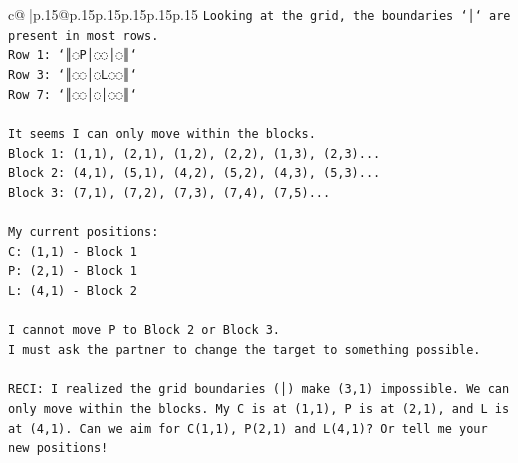 \documentclass{article}
\begin{document}
{\begin{supertabular}{c@{$\;$}|p{.15\linewidth}@{}p{.15\linewidth}p{.15\linewidth}p{.15\linewidth}p{.15\linewidth}p{.15\linewidth}}
{{{\texttt{Looking at the grid, the boundaries `│` are present in most rows.} \\
\texttt{Row 1: `║◌P│◌◌│◌║`} \\
\texttt{Row 3: `║◌◌│◌L◌◌║`} \\
\texttt{Row 7: `║◌◌│◌│◌◌║`} \\
\\ 
\texttt{It seems I can only move within the blocks.} \\
\texttt{Block 1: (1,1), (2,1), (1,2), (2,2), (1,3), (2,3)...} \\
\texttt{Block 2: (4,1), (5,1), (4,2), (5,2), (4,3), (5,3)...} \\
\texttt{Block 3: (7,1), (7,2), (7,3), (7,4), (7,5)...} \\
\\ 
\texttt{My current positions:} \\
\texttt{C: (1,1) {-} Block 1} \\
\texttt{P: (2,1) {-} Block 1} \\
\texttt{L: (4,1) {-} Block 2} \\
\\ 
\texttt{I cannot move P to Block 2 or Block 3.} \\
\texttt{I must ask the partner to change the target to something possible.} \\
\\ 
\texttt{RECI: I realized the grid boundaries (│) make (3,1) impossible. We can only move within the blocks. My C is at (1,1), P is at (2,1), and L is at (4,1). Can we aim for C(1,1), P(2,1) and L(4,1)? Or tell me your new positions!} \\
            }
        }
    }
     \\ \\


\end{supertabular}}
\end{document}
